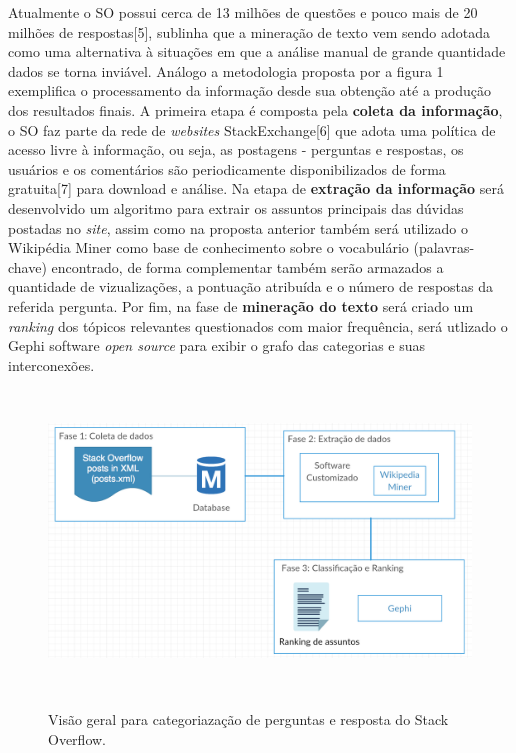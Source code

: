 \documentclass[10pt,a4paper,final]{article}
\begin{document}
Atualmente o SO possui cerca de 13 milhões de questões e pouco mais de 20 milhões de respostas[5], \cite{Krippendorff2012} sublinha que a mineração de texto vem sendo adotada como uma alternativa à situações em que a análise manual de grande quantidade dados se torna inviável. Análogo a metodologia proposta por \cite{Arash2016} a figura 1 exemplifica o processamento da informação desde sua obtenção até a produção dos resultados finais.
\newline
\newline
A primeira etapa é composta pela \textbf{coleta da informação}, o SO faz parte da rede de \textit{websites} StackExchange[6] que adota uma política de acesso livre à informação, ou seja, as postagens - perguntas e respostas, os usuários e os comentários são periodicamente disponibilizados de forma gratuita[7] para download e análise.
\newline
\newline
Na etapa de \textbf{extração da informação} será desenvolvido um algoritmo para extrair os assuntos principais \cite{Turney:2000:LAK:593957.593993} das dúvidas postadas no \textit{site}, assim como na proposta anterior também será utilizado o Wikipédia Miner \cite{Milne2012} como base de conhecimento sobre o vocabulário (palavras-chave) encontrado, de forma complementar também serão armazados a quantidade de vizualizações, a pontuação atribuída e o número de respostas da referida pergunta.
\newline
\newline
Por fim, na fase de \textbf{mineração do texto} será criado um \textit{ranking} \cite{mihalcea-tarau:2004:EMNLP} dos tópicos relevantes questionados com maior frequência, será utlizado o Gephi \cite{ICWSM09154} software \textit{open source} para exibir o grafo das categorias e suas interconexões.

\begin{figure}[!htb]
\centering
\includegraphics[height=8cm]{Figures/figura_1_metodologia}
\label{fig:figura_1_metodologia}   
\caption{Visão geral para categoriazação de perguntas e resposta do Stack Overflow.}
\end{figure}
\end{document}
